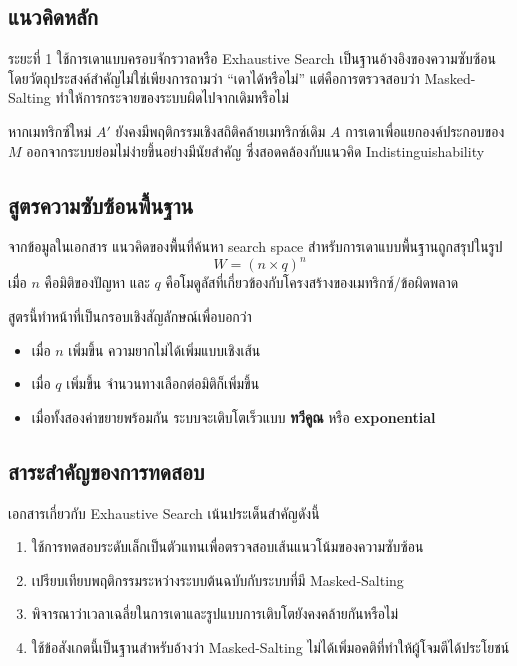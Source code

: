 \documentclass[12pt,a4paper]{article}
\newcommand{\term}[1]{\textbf{#1}}
\newcommand{\eng}[1]{\textenglish{#1}}
\begin{document}
	\subsection{แนวคิดหลัก}
	
	ระยะที่ 1 ใช้การเดาแบบครอบจักรวาลหรือ \eng{Exhaustive Search} เป็นฐานอ้างอิงของความซับซ้อน โดยวัตถุประสงค์สำคัญไม่ใช่เพียงการถามว่า ``เดาได้หรือไม่'' แต่คือการตรวจสอบว่า \eng{Masked-Salting} ทำให้การกระจายของระบบผิดไปจากเดิมหรือไม่
	
	หากเมทริกซ์ใหม่ $A'$ ยังคงมีพฤติกรรมเชิงสถิติคล้ายเมทริกซ์เดิม $A$ การเดาเพื่อแยกองค์ประกอบของ $M$ ออกจากระบบย่อมไม่ง่ายขึ้นอย่างมีนัยสำคัญ ซึ่งสอดคล้องกับแนวคิด \eng{Indistinguishability}
	
	\subsection{สูตรความซับซ้อนพื้นฐาน}
	
	จากข้อมูลในเอกสาร แนวคิดของพื้นที่ค้นหา \eng{search space} สำหรับการเดาแบบพื้นฐานถูกสรุปในรูป
	\[
	W = (n \times q)^n
	\]
	เมื่อ $n$ คือมิติของปัญหา และ $q$ คือโมดูลัสที่เกี่ยวข้องกับโครงสร้างของเมทริกซ์/ข้อผิดพลาด
	
	สูตรนี้ทำหน้าที่เป็นกรอบเชิงสัญลักษณ์เพื่อบอกว่า
	\begin{itemize}
		\item เมื่อ $n$ เพิ่มขึ้น ความยากไม่ได้เพิ่มแบบเชิงเส้น
		\item เมื่อ $q$ เพิ่มขึ้น จำนวนทางเลือกต่อมิติก็เพิ่มขึ้น
		\item เมื่อทั้งสองค่าขยายพร้อมกัน ระบบจะเติบโตเร็วแบบ \term{ทวีคูณ} หรือ \term{exponential}
	\end{itemize}
	
	\subsection{สาระสำคัญของการทดสอบ}
	
	เอกสารเกี่ยวกับ \eng{Exhaustive Search} เน้นประเด็นสำคัญดังนี้
	\begin{enumerate}[label=\arabic*.]
		\item ใช้การทดสอบระดับเล็กเป็นตัวแทนเพื่อตรวจสอบเส้นแนวโน้มของความซับซ้อน
		\item เปรียบเทียบพฤติกรรมระหว่างระบบต้นฉบับกับระบบที่มี \eng{Masked-Salting}
		\item พิจารณาว่าเวลาเฉลี่ยในการเดาและรูปแบบการเติบโตยังคงคล้ายกันหรือไม่
		\item ใช้ข้อสังเกตนี้เป็นฐานสำหรับอ้างว่า \eng{Masked-Salting} ไม่ได้เพิ่มอคติที่ทำให้ผู้โจมตีได้ประโยชน์
	\end{enumerate}
	
\end{document}
